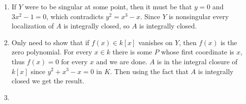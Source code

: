 \documentclass{note}
\begin{document}
\Ex
\begin{enumerate}
  \item If $Y$ were to be singular at some point, then it must be that
        $y = 0$ and $3x^2-1 = 0$, which contradicts $y^2 = x^3 - x$. Since
        $Y$ is nonsingular every localization of $A$ is integrally closed,
        so $A$ is integrally closed.
  \item Only need to show that if $f(x) \in k[x]$
        vanishes on $Y$, then $f(x)$ is the zero polynomial. For every $x\in k$ there
        is some $P$ whose first coordinate is $x$, thus $f(x) = 0$ for every $x$ and we
        are done. $A$ is in the integral closure of $k[x]$ since $y^2 + x^3 - x = 0$ in
        $K$. Then using the fact that $A$ is integrally closed we get the result.
  \item
\end{enumerate}
\end{document}
